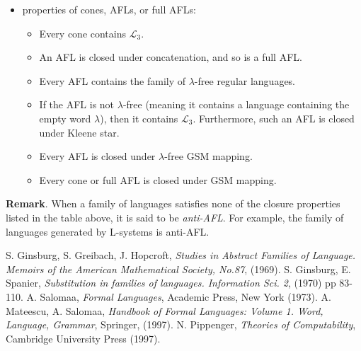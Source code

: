 \documentclass[12pt]{article}
\begin{document}
\begin{itemize}
\begin{itemize}
\end{itemize}
\item properties of cones, AFLs, or full AFLs:
\begin{itemize}
\item Every cone contains $\mathscr{L}_3$.
\item An AFL is closed under concatenation, and so is a full AFL.
\item Every AFL contains the family of $\lambda$-free regular languages.  
\item If the AFL is not $\lambda$-free (meaning it contains a language containing the empty word $\lambda$), then it contains $\mathscr{L}_3$.  Furthermore, such an AFL is closed under Kleene star.
\item Every AFL is closed under $\lambda$-free GSM mapping.
\item Every cone or full AFL is closed under GSM mapping.
\end{itemize}
\end{itemize}

\textbf{Remark}.  When a family of languages satisfies none of the closure properties listed in the table above, it is said to be \emph{anti-AFL}.  For example, the family of languages generated by L-systems is anti-AFL.

\begin{thebibliography}{9}
 S. Ginsburg, S. Greibach, J. Hopcroft, {\em Studies in Abstract Families of Language. Memoirs of the American Mathematical Society, No.87}, (1969).
 S. Ginsburg, E. Spanier, {\em Substitution in families of languages.  Information Sci. 2}, (1970) pp 83-110.
 A. Salomaa, {\em Formal Languages}, Academic Press, New York (1973).
 A. Mateescu, A. Salomaa, {\em Handbook of Formal Languages: Volume 1. Word, Language, Grammar}, Springer, (1997).
 N. Pippenger, {\em Theories of Computability}, Cambridge University Press (1997).
\end{thebibliography}
\end{document}

